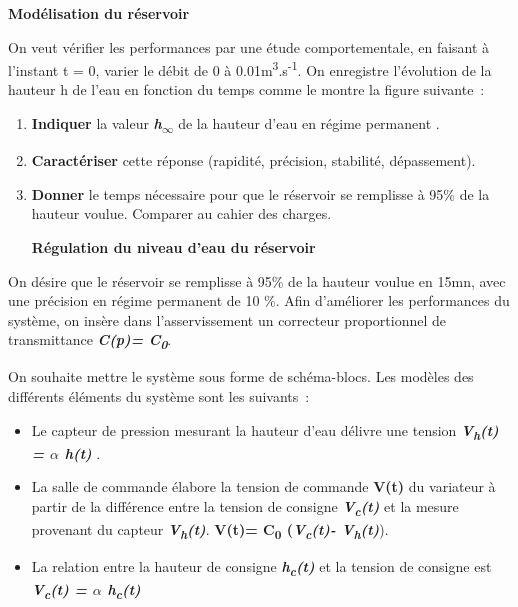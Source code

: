 \textbf{Modélisation du réservoir}

On veut vérifier les performances par une étude comportementale, en
faisant à l'instant t = 0, varier le débit de 0 à
0.01m\textsuperscript{3}.s\textsuperscript{-1}. On enregistre
l'évolution de la hauteur h de l'eau en fonction du temps comme le
montre la figure suivante~:


\begin{enumerate}
\def\labelenumi{\arabic{enumi}.}
\item
  \textbf{Indiquer} la valeur \emph{\textbf{h\textsubscript{$\infty$}}} de la
  hauteur d'eau en régime permanent .
\item
  \textbf{Caractériser} cette réponse (rapidité, précision, stabilité,
  dépassement).
\item
  \textbf{Donner} le temps nécessaire pour que le réservoir se remplisse
  à 95\% de la hauteur voulue. Comparer au cahier des charges.

  \textbf{Régulation du niveau d'eau du réservoir}
\end{enumerate}

On désire que le réservoir se remplisse à 95\% de la hauteur voulue en
15mn, avec une précision en régime permanent de 10 \%. Afin d'améliorer
les performances du système, on insère dans l'asservissement un
correcteur proportionnel de transmittance \emph{\textbf{C(p)=
C\textsubscript{0}}}.

On souhaite mettre le système sous forme de schéma-blocs. Les modèles
des différents éléments du système sont les suivants~:

\begin{itemize}
\item
  Le capteur de pression mesurant la hauteur d'eau délivre une tension
  \emph{\textbf{V\textsubscript{h}(t) = $\alpha$ h(t)}} .
\end{itemize}

\begin{itemize}
\item
  La salle de commande élabore la tension de commande \textbf{V(t)} du
  variateur à partir de la différence entre la tension de consigne
  \emph{\textbf{V\textsubscript{c}(t)}} et la mesure provenant du
  capteur \emph{\textbf{V\textsubscript{h}(t)}}. \textbf{V(t)=
  C\textsubscript{0} (\emph{V\textsubscript{c}(t)-
  V\textsubscript{h}(t)}}).
\end{itemize}

\begin{itemize}
\item
  La relation entre la hauteur de consigne
  \emph{\textbf{h\textsubscript{c}(t)}} et la tension de consigne est
  \emph{\textbf{V\textsubscript{c}(t) = $\alpha$ h\textsubscript{c}(t)}}
\end{itemize}

